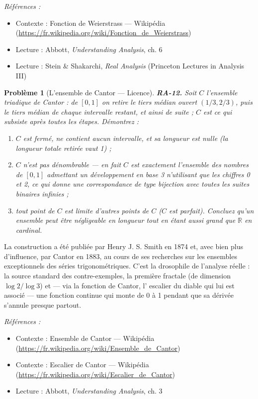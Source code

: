 \documentclass[11pt]{article}
\newtheorem{problem}{Problème}
\newenvironment{refs}{\par\small\noindent\emph{Références :}\begin{itemize}\setlength\itemsep{0pt}}{\end{itemize}\normalsize}
\begin{document}
\begin{refs}
\item Contexte : Fonction de Weierstrass --- Wikipédia (\url{https://fr.wikipedia.org/wiki/Fonction_de_Weierstrass})
\item Lecture : Abbott, \textit{Understanding Analysis}, ch. 6
\item Lecture : Stein \& Shakarchi, \textit{Real Analysis} (Princeton Lectures in Analysis III)
\end{refs}

\bigskip

\begin{problem}[{L'ensemble de Cantor --- Licence}]
\textbf{RA-12.} Soit $ C $ l'ensemble triadique de Cantor : de
$ [0, 1] $ on retire le tiers médian ouvert $ (1/3, 2/3) $, puis le tiers médian de chaque
intervalle restant, et ainsi de suite ; $ C $ est ce qui subsiste après toutes les étapes.
Démontrez :
\begin{enumerate}
\item[(a)] $ C $ est fermé, ne contient aucun intervalle, et sa \og{} longueur \fg{} est nulle (la longueur
totale retirée vaut 1) ;
\item[(b)] $ C $ n'est pas dénombrable --- en fait $ C $ est exactement l'ensemble des nombres de
$ [0, 1] $ admettant un développement en base 3 n'utilisant que les chiffres 0 et 2, ce qui donne
une correspondance de type bijection avec toutes les suites binaires infinies ;
\item[(c)] tout point de $ C $
est limite d'autres points de $ C $ ($ C $ est parfait). Concluez qu'un ensemble peut être
négligeable en longueur tout en étant aussi grand que $ \mathbb{R} $ en cardinal.
\end{enumerate}

\end{problem}

\noindent La construction a été publiée par Henry J. S. Smith en 1874 et, avec bien plus
d'influence, par Cantor en 1883, au cours de ses recherches sur les ensembles exceptionnels des
séries trigonométriques. C'est la drosophile de l'analyse réelle : la source standard des
contre-exemples, la première fractale (de dimension $ \log 2 / \log 3 $) et --- via la fonction de
Cantor, l'\og{} escalier du diable \fg{} qui lui est associé --- une fonction continue qui monte de 0 à 1
pendant que sa dérivée s'annule presque partout.

\begin{refs}
\item Contexte : Ensemble de Cantor --- Wikipédia (\url{https://fr.wikipedia.org/wiki/Ensemble_de_Cantor})
\item Contexte : Escalier de Cantor --- Wikipédia (\url{https://fr.wikipedia.org/wiki/Escalier_de_Cantor})
\item Lecture : Abbott, \textit{Understanding Analysis}, ch. 3
\end{refs}
\end{document}
